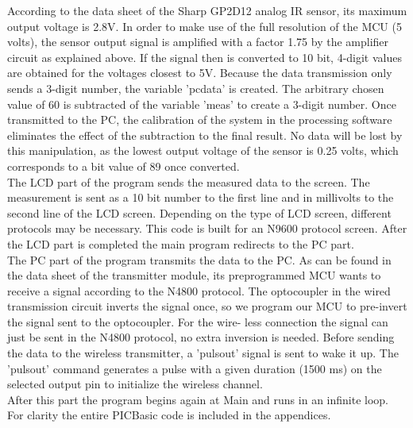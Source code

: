 \documentclass[12pt]{article}
\begin{document}
\noindent According to the data sheet of the Sharp GP2D12 analog IR sensor, its maximum output voltage is 2.8V. In order to make use of the full resolution of the MCU (5 volts), the sensor output signal is amplified with a factor 1.75 by the amplifier circuit as explained above. If the signal then is converted to 10 bit, 4-digit values are obtained for the voltages closest to 5V. Because the data transmission only sends a 3-digit number, the variable ’pcdata’ is created. The arbitrary chosen value of 60 is subtracted of the variable ’meas’ to create a 3-digit number. Once transmitted to the PC, the calibration of the system in the processing software eliminates the effect of the subtraction to the final result. No data will be lost by this manipulation, as the lowest output voltage of the sensor is 0.25 volts, which corresponds to a bit value of 89 once converted.\\

\noindent The LCD part of the program sends the measured data to the screen. The measurement is sent as a 10 bit number to the first line and in millivolts to the second line of the LCD screen. Depending on the type of LCD screen, different protocols may be necessary. This code is built for an N9600 protocol screen. After the LCD part is completed the main program redirects to the PC part.\\

\noindent The PC part of the program transmits the data to the PC. As can be found in the data sheet of the transmitter module, its preprogrammed MCU wants to receive a signal according to the N4800 protocol. The optocoupler in the wired transmission circuit inverts the signal once, so we program our MCU to pre-invert the signal sent to the optocoupler. For the wire- less connection the signal can just be sent in the N4800 protocol, no extra inversion is needed. Before sending the data to the wireless transmitter, a ’pulsout’ signal is sent to wake it up. The ’pulsout’ command generates a pulse with a given duration (1500 ms) on the selected output pin to initialize the wireless channel.\\

\noindent After this part the program begins again at Main and runs in an infinite loop. For clarity the entire PICBasic code is included in the appendices.


 
 
\end{document}
